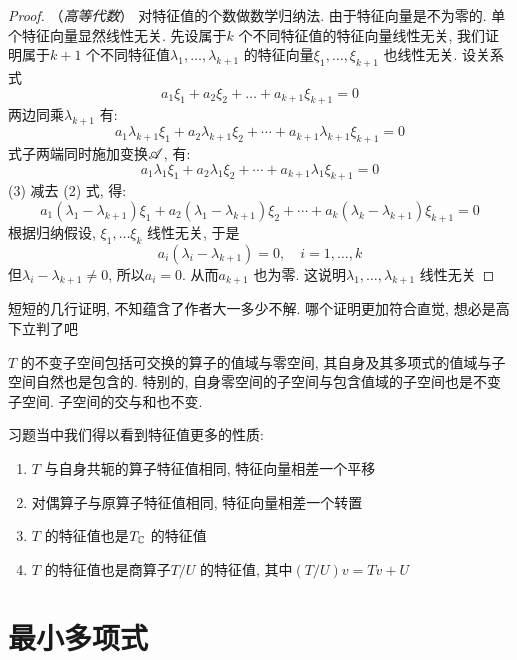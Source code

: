 \begin{proof}
    （\textit{高等代数}）
    对特征值的个数做数学归纳法. 由于特征向量是不为零的. 单个特征向量显然线性无关. 先设属于\(k\)
    个不同特征值的特征向量线性无关, 我们证明属于\(k+1\) 个不同特征值\(\lambda_1,\dots
    ,\lambda_{k+1}\) 的特征向量\(\xi_1,\dots ,\xi_{k+1}\) 也线性无关.
    设关系式
    \begin{equation}
        a_1\xi_1 + a_2\xi_2 + \dots + a_{k+1}\xi_{k+1} = 0 \tag{1}
    \end{equation}
    两边同乘\(\lambda_{k+1}\) 有:
    \[
        a_1\lambda_{k+1}\xi_1 + a_2\lambda_{k+1}\xi_2 +
        \cdots + a_{k+1}\lambda_{k+1}\xi_{k+1} = 0 \tag{2}
    \]
    式子两端同时施加变换\(\mathscr{A}\), 有:
    \[
        a_1\lambda_1\xi_1 + a_2\lambda_1\xi_2 + \cdots +
        a_{k+1}\lambda_1\xi_{k+1} = 0 \tag{3}
    \]
    (3) 减去 (2) 式, 得:
    \[
        a_1(\lambda_1 - \lambda_{k+1})\xi_1 + a_2(\lambda_1
        - \lambda_{k+1})\xi_2 + \cdots +
        a_{k}(\lambda_{k} - \lambda_{k+1})\xi_{k+1} = 0
    \]
    根据归纳假设, \(\xi_1,\dots \xi_{k}\) 线性无关, 于是
    \[
        a_{i}(\lambda_{i} - \lambda_{k+1}) = 0, \quad i=1,\dots ,k
    \]
    但\(\lambda_{i}-\lambda_{k+1}\neq 0\), 所以\(a_{i}=0\).
    从而\(a_{k+1}\) 也为零. 这说明\(\lambda_1,\dots ,\lambda_{k+1}\) 线性无关
\end{proof}

短短的几行证明, 不知蕴含了作者大一多少不解. 哪个证明更加符合直觉,
想必是高下立判了吧

\(T\) 的不变子空间包括可交换的算子的值域与零空间, 其自身及其多项式的值域与子空间自然也是包含的.
特别的, 自身零空间的子空间与包含值域的子空间也是不变子空间. 子空间的交与和也不变.

习题当中我们得以看到特征值更多的性质:
\begin{enumerate}
    \item \(T\) 与自身共轭的算子特征值相同, 特征向量相差一个平移
    \item 对偶算子与原算子特征值相同, 特征向量相差一个转置
    \item \(T\) 的特征值也是\(T_{\mathbb{C}}\) 的特征值
    \item \(T\) 的特征值也是商算子\(T/U\) 的特征值, 其中\((T/U)v=Tv+U\)
\end{enumerate}

\section{最小多项式}



